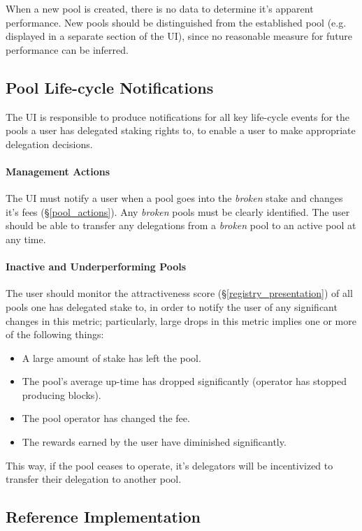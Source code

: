 When a new pool is created, there is no data to determine it's apparent performance. New pools should be distinguished from the established pool (e.g. displayed in a separate section of the UI), since no reasonable measure for future performance can be inferred. 

\subsection{Pool Life-cycle Notifications}
The UI is responsible to produce notifications for all key life-cycle events for the pools a user has delegated staking rights to, to enable a user to make appropriate delegation decisions. 

\paragraph*{Management Actions}
The UI must notify a user when a pool goes into the \textit{broken} stake and changes it's fees (\S\ref{pool_actions}). Any \textit{broken} pools must be clearly identified. The user should be able to transfer any delegations from a \textit{broken}  pool to an active pool at any time. 

\paragraph*{Inactive and Underperforming Pools}
The user should monitor the attractiveness score (\S\ref{registry_presentation}) of all pools one has delegated stake to, in order to notify the user of any significant changes in this metric; particularly, large drops in this metric implies one or more of the following things: 
\begin{itemize}[label=--,nosep]
    \item A large amount of stake has left the pool.
    \item The pool's average up-time has dropped significantly (operator has stopped producing blocks). 
    \item The pool operator has changed the fee. 
    \item The rewards earned by the user have diminished significantly. 
\end{itemize}

This way, if the pool ceases to operate, it's delegators will be incentivized to transfer their delegation to another pool. 

\subsection{Reference Implementation}

